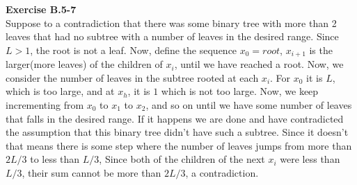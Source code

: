 \documentclass{article}
\begin{document}
\noindent\textbf{Exercise B.5-7}\\
Suppose to a contradiction that there was some binary tree with more than 2 leaves that had no subtree with a number of leaves in the desired range. Since $L>1$, the root is not a leaf. Now, define the sequence $x_0 = root$, $x_{i+1}$ is the larger(more leaves) of the children of $x_i$, until we have reached a root. Now, we consider the number of leaves in the subtree rooted at each $x_i$. For $x_0$ it is $L$, which is too large, and at $x_h$, it is $1$ which is not too large. Now, we keep incrementing from $x_0$ to $x_1$ to $x_2$, and so on until we have some number of leaves that falls in the desired range. If it happens we are done and have contradicted the assumption that this binary tree didn't have such a subtree. Since it doesn't that means there is some step where the number of leaves jumps from more than $2L/3$ to less than $L/3$, Since both of the children of the next $x_i$ were less than $L/3$, their sum cannot be more than $2L/3$, a contradiction.
\end{document}
